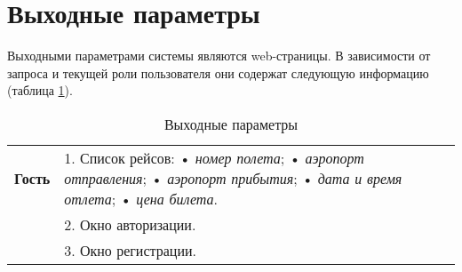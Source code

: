 \section{Выходные параметры}
Выходными параметрами системы являются web-страницы. В зависимости от запроса и текущей роли пользователя они содержат следующую информацию (таблица \ref{tbl:output-data}).

\begin{longtable}{|p{0.5cm}|p{15.5cm}|}
	\caption{Выходные параметры}
	\label{tbl:output-data} \\
	\hline
	
	\begin{rotatebox}[origin=r]{90}
		{\textbf{Гость}}
	\end{rotatebox} 
	& 
	1. Список рейсов: \newline
    • \textit{номер полета}; \newline
    • \textit{аэропорт отправления}; \newline
    • \textit{аэропорт прибытия}; \newline
    • \textit{дата и время отлета}; \newline
    • \textit{цена билета}. \\
	\cline{2-2}
    &
  2. Окно авторизации. \\
	\cline{2-2}
    &
	3. Окно регистрации. \\
	\hline
	

\end{longtable}
